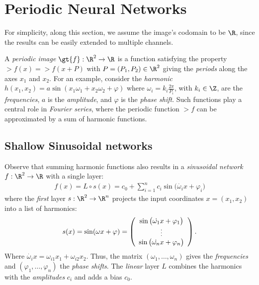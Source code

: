 \section{Periodic Neural Networks}
For simplicity, along this section, we assume the image's codomain to be $\R$, since the results can be easily extended to multiple channels.

A \textit{periodic image} $\gt{f}:\R^2\to \R$ is a function satisfying the property $\gt{f}(x) \!=\! \gt{f}(x + P)$ with $P=(P_1, P_2)\in \R^2$ giving the \textit{periods} along the axes $x_1$ and $x_2$.
For an example, consider the \textit{harmonic} $h(x_1, x_2)=a\sin(x_1\omega_1+x_2\omega_2+ \varphi)$ where $\omega_i\!=\!k_i\frac{2\pi}{P_i}$, with $k_i\in\Z$, are the \textit{frequencies}, $a$ is the \textit{amplitude}, and $\varphi$ is the \textit{phase shift}.
Such functions play a central role in \textit{Fourier series}, where the periodic function $\gt{f}$ can be approximated by a sum of harmonic functions.


\subsection{Shallow Sinusoidal networks}
Observe that summing harmonic functions also results in a \textit{sinusoidal network} $f:\R^2\to \R$ with a single layer:
\begin{align}\label{e-fourier_series}
    f(x) = L\circ s(x) =  c_0 + \sum_{i=1}^{n} c_i  \sin\Big(\dot{\omega_i}{ x}+ \varphi_i\Big)
\end{align}
where the \textit{first} layer $s:\R^2\to \R^{n}$ projects the input coordinates $x=(x_1,x_2)$ into a list of harmonics:
\begin{align}\label{e-firstlayer}
\displaystyle
    s(x)=\sin(\omega x +\varphi)=
    \left(
    \begin{array}{c}
        \sin\big(\dot{\omega_1}{x}+\varphi_1\big)\\
         {\footnotesize\vdots}\\
         \sin\big(\dot{\omega_{n}}{x}+\varphi_{n}\big)
    \end{array}
    \right).
\end{align}
Where $\dot{\omega_i}{x}=\omega_{i1}x_1+\omega_{i2}x_2$. Thus, the matrix $(\omega_1, \ldots, \omega_{n})$ gives the \textit{frequencies} and $(\varphi_1, \ldots, \varphi_{n})$ the \textit{phase shifts}.
The \textit{linear} layer $L$ combines the harmonics with the \textit{amplitudes} $c_i$ and adds a bias $c_0$.

